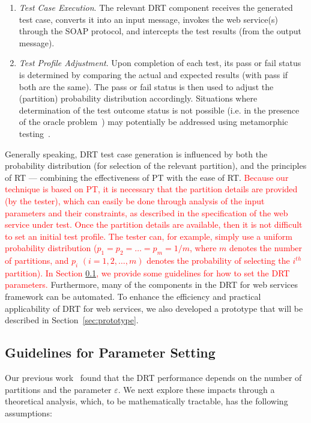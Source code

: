 \documentclass[10pt,journal,compsoc]{IEEEtran}
\begin{document}
\begin{enumerate}[1)]
  \item
  \emph{Test Case Execution}.
  The relevant DRT component receives the generated test case, converts it into an input message, invokes the web service(s) through the SOAP protocol, and intercepts the test results (from the output message).

  \item
  \emph{Test Profile Adjustment}.
  Upon completion of each test, its pass or fail status is determined by comparing the actual and expected results (with pass if both are the same).
  The pass or fail status is then used to adjust the (partition) probability distribution accordingly.
  Situations where determination of the test outcome status is not possible (i.e. in the presence of the oracle problem~\cite{weyuker1982testing, barr2015oracle, patel2018mapping}) may potentially be addressed using metamorphic testing~\cite{sun2011}.
\end{enumerate}
Generally speaking, DRT test case generation is influenced by both the probability distribution (for selection of the relevant partition), and the principles of RT
---
combining the effectiveness of PT with the ease of RT.
\textcolor{red}{Because our technique is based on PT, it is necessary that the partition details are provided (by the tester), which can easily be done through analysis of the input parameters and their constraints, as described in the specification of the web service under test. Once the partition details are available, then it is not difficult to set an initial test profile. The tester can, for example, simply use a uniform probability distribution ($p_1 = p_2 = \ldots = p_m = 1 / m$, where $m$ denotes the number of partitions, and $p_i $ $(i = 1,2,\ldots,m)$ denotes the probability of selecting the $i^{th}$ partition). In Section \ref{sec:relation}, we provide some guidelines for how to set the DRT parameters.}
Furthermore, many of the components in the DRT for web services framework can be automated.
To enhance the efficiency and practical applicability of DRT for web services, we also developed a prototype that will be described in Section~\ref{sec:prototype}.

\subsection{Guidelines for Parameter Setting}
\label{sec:relation}

Our previous work~\cite{sun2012towards} found that the DRT performance depends on the number of partitions and the parameter $\varepsilon$.
We next explore these impacts through a theoretical analysis, which, to be mathematically tractable, has the following assumptions:
\end{document}
